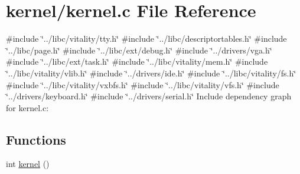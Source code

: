 \hypertarget{a00062}{}\section{kernel/kernel.c File Reference}
\label{a00062}
{\ttfamily \#include \char`\"{}../libc/vitality/tty.\+h\char`\"{}}\newline
{\ttfamily \#include \char`\"{}../libc/descriptortables.\+h\char`\"{}}\newline
{\ttfamily \#include \char`\"{}../libc/page.\+h\char`\"{}}\newline
{\ttfamily \#include \char`\"{}../libc/ext/debug.\+h\char`\"{}}\newline
{\ttfamily \#include \char`\"{}../drivers/vga.\+h\char`\"{}}\newline
{\ttfamily \#include \char`\"{}../libc/ext/task.\+h\char`\"{}}\newline
{\ttfamily \#include \char`\"{}../libc/vitality/mem.\+h\char`\"{}}\newline
{\ttfamily \#include \char`\"{}../libc/vitality/vlib.\+h\char`\"{}}\newline
{\ttfamily \#include \char`\"{}../drivers/ide.\+h\char`\"{}}\newline
{\ttfamily \#include \char`\"{}../libc/vitality/fs.\+h\char`\"{}}\newline
{\ttfamily \#include \char`\"{}../libc/vitality/vxbfs.\+h\char`\"{}}\newline
{\ttfamily \#include \char`\"{}../libc/vitality/vfs.\+h\char`\"{}}\newline
{\ttfamily \#include \char`\"{}../drivers/keyboard.\+h\char`\"{}}\newline
{\ttfamily \#include \char`\"{}../drivers/serial.\+h\char`\"{}}\newline
Include dependency graph for kernel.\+c\+:
\subsection*{Functions}
\begin{DoxyCompactItemize}
\item 
int \hyperlink{a00062_a4ee3d1f05046b7afc6b4d516bf10667a_a4ee3d1f05046b7afc6b4d516bf10667a}{kernel} ()
\end{DoxyCompactItemize}
